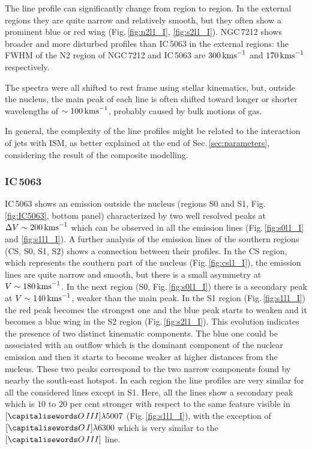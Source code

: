 \documentclass[../main.tex]{subfiles}
\begin{document}
The line profile can significantly change from region to region.
In the external regions they are quite narrow and relatively smooth, but they often show a prominent blue or red wing (Fig.\,\ref{fig:n2l1_I}, \ref{fig:s2l1_I}).
NGC\,7212 shows broader and more disturbed profiles than IC\,5063 in the external regions: the FWHM of the N2 region of NGC\,7212 and IC\,5063 are $300\,\si{\kms}$ and $170\,\si{\kms}$ respectively.

The spectra were all shifted to rest frame using stellar kinematics, but, outside the nucleus, the main peak of each line is often shifted toward longer or shorter wavelengths of $\sim100\,\si{\kms}$, probably caused by bulk motions of gas.

In general, the complexity of the line profiles might be related to the interaction of jets with ISM, as better explained at the end of Sec.\,\ref{sec:parameters}, considering the result of the composite modelling.


\subsubsection{IC\,5063}
IC\,5063 shows an emission outside the nucleus (regions S0 and S1, Fig.\,\ref{fig:IC5063}, bottom panel) characterized by two well resolved peaks at $\Delta V\sim 200\,\si{\kms}$ which can be observed in all the emission lines (Fig.\,\ref{fig:s0l1_I} and \ref{fig:s1l1_I}).
A further analysis of the emission lines of the southern regions (CS, S0, S1, S2) shows a connection between their profiles.
In the CS region, which represents the southern part of the nucleus (Fig.\,\ref{fig:csl1_I}), the emission lines are quite narrow and smooth, but there is a small asymmetry at $V\sim 180\,\si{\kms}$.
In the next region (S0, Fig.\,\ref{fig:s0l1_I}) there is a secondary peak at $V\sim 140\,\si{\kms}$, weaker than the main peak.  
In the S1 region (Fig.\,\ref{fig:s1l1_I}) the red peak becomes the strongest one and the blue peak starts to weaken and it becomes a blue wing in the S2 region (Fig.\,\ref{fig:s2l1_I}).
This evolution indicates the presence of two distinct kinematic components.
The blue one could be associated with an outflow which is the dominant component of the nuclear emission and then it starts to become weaker at higher distances from the nucleus.
These two peaks correspond to the two narrow components found by \citet{Morganti07} nearby the south-east hotspot.
In each region the line profiles are very similar for all the considered lines except in S1.
Here, all the lines show a secondary peak which is $10$ to $20$ per cent stronger with respect to the same feature visible in $[\ion{O}{III}]\lambda5007$  (Fig.\,\ref{fig:s1l1_I}), with the exception of $[\ion{O}{I}]\lambda6300$ which is very similar to the $[\ion{O}{III}]$ line.
\end{document}
